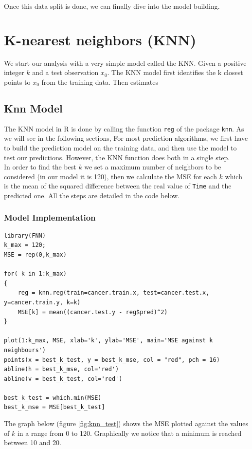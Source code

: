 \documentclass[]{report}
\begin{document}
Once this data split is done, we can finally dive into the model building.

\section{K-nearest neighbors (KNN)}
We start our analysis with a very simple model called the KNN.
Given a positive integer $k$ and a test observation $x_0$. The KNN model first identifies the k closest points to $x_0$ from the training data. Then estimates \\ 

\subsection{Knn Model}
The KNN model in R is done by calling the function \texttt{reg} of the package \texttt{knn}. As we will see in the following sections, For most prediction algorithms, we first have to build the prediction model on the training data, and then use the model to test our predictions. However, the KNN function does both in a single step.\\ 
In order to find the best $k$ we set a maximum number of neighbors to be considered (in our model it is 120), then we calculate the MSE for each $k$ which is the mean of the squared difference between the real value of \texttt{Time} and the predicted one. All the steps are detailed in the code below.

\subsubsection{Model Implementation}
\begin{lstlisting}
library(FNN)
k_max = 120;
MSE = rep(0,k_max)

for( k in 1:k_max)
{
	reg = knn.reg(train=cancer.train.x, test=cancer.test.x, y=cancer.train.y, k=k)
	MSE[k] = mean((cancer.test.y - reg$pred)^2)
}

plot(1:k_max, MSE, xlab='k', ylab='MSE', main='MSE against k neighbours')
points(x = best_k_test, y = best_k_mse, col = "red", pch = 16)
abline(h = best_k_mse, col='red')
abline(v = best_k_test, col='red')

best_k_test = which.min(MSE)
best_k_mse = MSE[best_k_test]
\end{lstlisting}

The graph below (figure \ref{fig:knn_test}) shows the MSE plotted against the values of $k$ in a range from 0 to 120. Graphically we notice that a minimum is reached between 10 and 20.
\end{document}

